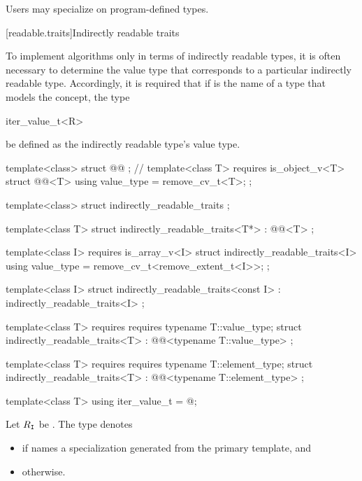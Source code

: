 \pnum
Users may specialize  on program-defined types.

[readable.traits]{Indirectly readable traits}

\pnum
To implement algorithms only in terms of indirectly readable types,
it is often necessary
to determine the value type that corresponds to
a particular indirectly readable type.
Accordingly, it is required that if  is the name of a type that
models the  concept,
the type
\begin{codeblock}
iter_value_t<R>
\end{codeblock}
be defined as the indirectly readable type's value type.

%
\begin{codeblock}
template<class> struct @@ { };     // \expos
template<class T>
  requires is_object_v<T>
struct @@<T> {
  using value_type = remove_cv_t<T>;
};

template<class> struct indirectly_readable_traits { };

template<class T>
struct indirectly_readable_traits<T*>
  : @@<T> { };

template<class I>
  requires is_array_v<I>
struct indirectly_readable_traits<I> {
  using value_type = remove_cv_t<remove_extent_t<I>>;
};

template<class I>
struct indirectly_readable_traits<const I>
  : indirectly_readable_traits<I> { };

template<class T>
  requires requires { typename T::value_type; }
struct indirectly_readable_traits<T>
  : @@<typename T::value_type> { };

template<class T>
  requires requires { typename T::element_type; }
struct indirectly_readable_traits<T>
  : @@<typename T::element_type> { };

template<class T> using iter_value_t = @\seebelow@;
\end{codeblock}

%
\pnum
Let $R_{\texttt{I}}$ be .
The type  denotes
\begin{itemize}
\item
{}
if  names a specialization
generated from the primary template, and

\item
{} otherwise.
\end{itemize}

